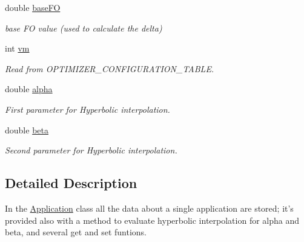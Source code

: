\begin{DoxyCompactItemize}
double \hyperlink{classApplication_aa703e7525d446d98b5cd51c959d35998}{base\-F\-O}
\begin{DoxyCompactList}\small\item\em base F\-O value (used to calculate the delta) \end{DoxyCompactList}\item 
int \hyperlink{classApplication_a0a3fe386eb8244e536bc5297709d1269}{vm}
\begin{DoxyCompactList}\small\item\em Read from O\-P\-T\-I\-M\-I\-Z\-E\-R\-\_\-\-C\-O\-N\-F\-I\-G\-U\-R\-A\-T\-I\-O\-N\-\_\-\-T\-A\-B\-L\-E. \end{DoxyCompactList}\item 
double \hyperlink{classApplication_a57e16d80835a1911b72c63d5eeb5d2f2}{alpha}
\begin{DoxyCompactList}\small\item\em First parameter for Hyperbolic interpolation. \end{DoxyCompactList}\item 
double \hyperlink{classApplication_a356ffae49ae223b3d98b57e56210e3a9}{beta}
\begin{DoxyCompactList}\small\item\em Second parameter for Hyperbolic interpolation. \end{DoxyCompactList}\end{DoxyCompactItemize}


\subsection{Detailed Description}
In the \hyperlink{classApplication}{Application} class all the data about a single application are stored; it's provided also with a method to evaluate hyperbolic interpolation for alpha and beta, and several get and set funtions. 

